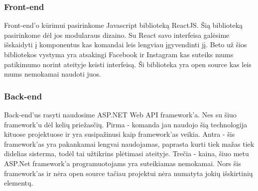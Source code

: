 \documentclass[oneside]{VUMIFPSkursinis}
\begin{document}
\subsubsection{Front-end} Front-end'o kūrimui pasirinkome Javascript biblioteką ReactJS. Šią biblioteką pasirinkome dėl jos modularaus dizaino. Su React savo interfeisa galėsime išskaidyti į komponentus kas komandai leis lengviau įgyvendinti jį. Beto už šios bibliotekos vystyma yra atsakingi Facebook ir Instagram kas suteiks mums patikimumo norint ateityje keisti interfeisą. Ši biblioteka yra open source kas leis mums nemokamai naudoti juos.
\subsubsection{Back-end} Back-end'us rasyti naudosime ASP.NET Web API framework'a. Nes su šiuo framework'u dėl kelių priežasčių. Pirma - komanda jau naudojo šią technologija kituose projektuose ir yra susipažinusi kaip framework'as veikia. Antra - šis framework'as yra pakankamai lengvai naudojamas, paprasta kurti tiek mažas tiek didelias sisterma, todėl tai užtikrins plėtimasi ateityje. Trečia - kaina, šiuo metu ASP.Net framework'a programuotojams yra suteikiamas nemokamai. Nors šis framework'as ir nėra open source tačiau projektui nėra numatyta jokių išskirtinių elementų.
 
 
\end{document}
